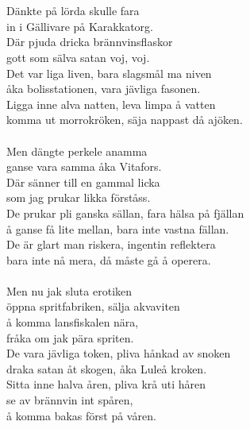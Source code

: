 \\
\vspace{10pt}\\ 
Dänkte på lörda skulle fara\\
in i Gällivare på Karakkatorg.\\
Där pjuda dricka brännvinsflaskor\\
gott som sälva satan voj, voj.\\
Det var liga liven, bara slagsmål ma niven\\
åka bolisstationen, vara jävliga fasonen.\\
Ligga inne alva natten, leva limpa å vatten\\
komma ut morrokröken, säja nappast då ajöken.\\
\\
Men dängte perkele anamma\\
ganse vara samma åka Vitafors.\\
Där sänner till en gammal licka\\
som jag prukar likka förståss.\\
De prukar pli ganska sällan, fara hälsa på fjällan\\
å ganse få lite mellan, bara inte vastna fällan.\\
De är glart man riskera, ingentin reflektera\\
bara inte nå mera, då måste gå å operera.\\
\\
Men nu jak sluta erotiken\\
öppna spritfabriken, sälja akvaviten\\
å komma lansfiskalen nära,\\
fråka om jak pära spriten.\\
De vara jävliga token, pliva hånkad av snoken\\
draka satan åt skogen, åka Luleå kroken.\\
Sitta inne halva åren, pliva krå uti håren\\
se av brännvin int spåren,\\
å komma bakas först på våren.
